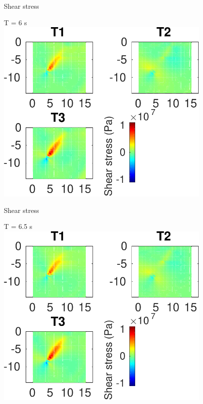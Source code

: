 \documentclass{beamer}
\begin{document}
\begin{frame}
 {Shear stress}
 
 \centering \Large T = 6 s\\
 \includegraphics[width=0.8\textwidth]{images/vertical_00066}
 
\end{frame}

\begin{frame}
 {Shear stress}
 
 \centering \Large T = 6.5 s\\
 \includegraphics[width=0.8\textwidth]{images/vertical_00071}
 
\end{frame}
\end{document}

